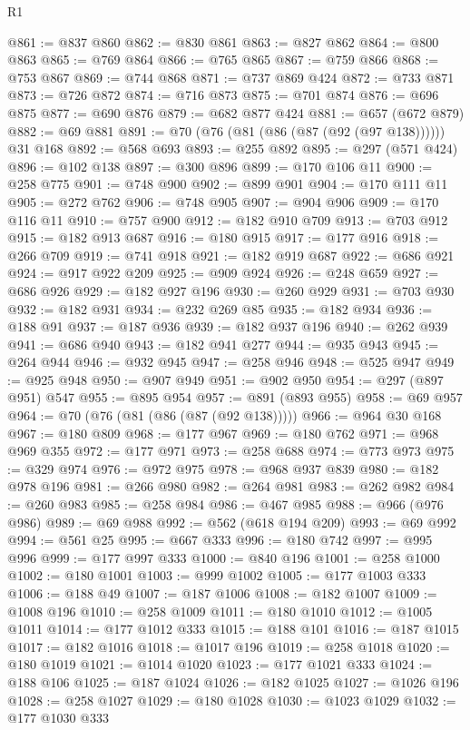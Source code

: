 \begin{lexlean}{R1}
\begin{coremodule}
@861 := @837 @860
@862 := @830 @861
@863 := @827 @862
@864 := @800 @863
@865 := @769 @864
@866 := @765 @865
@867 := @759 @866
@868 := @753 @867
@869 := @744 @868
@871 := @737 @869 @424
@872 := @733 @871
@873 := @726 @872
@874 := @716 @873
@875 := @701 @874
@876 := @696 @875
@877 := @690 @876
@879 := @682 @877 @424
@881 := @657 (@672 @879)
@882 := @69 @881
@891 := @70 (@76 (@81 (@86 (@87 (@92 (@97 @138)))))) @31 @168
@892 := @568 @693
@893 := @255 @892
@895 := @297 (@571 @424)
@896 := @102 @138
@897 := @300 @896
@899 := @170 @106 @11
@900 := @258 @775
@901 := @748 @900
@902 := @899 @901
@904 := @170 @111 @11
@905 := @272 @762
@906 := @748 @905
@907 := @904 @906
@909 := @170 @116 @11
@910 := @757 @900
@912 := @182 @910 @709
@913 := @703 @912
@915 := @182 @913 @687
@916 := @180 @915
@917 := @177 @916
@918 := @266 @709
@919 := @741 @918
@921 := @182 @919 @687
@922 := @686 @921
@924 := @917 @922 @209
@925 := @909 @924
@926 := @248 @659
@927 := @686 @926
@929 := @182 @927 @196
@930 := @260 @929
@931 := @703 @930
@932 := @182 @931
@934 := @232 @269 @85
@935 := @182 @934
@936 := @188 @91
@937 := @187 @936
@939 := @182 @937 @196
@940 := @262 @939
@941 := @686 @940
@943 := @182 @941 @277
@944 := @935 @943
@945 := @264 @944
@946 := @932 @945
@947 := @258 @946
@948 := @525 @947
@949 := @925 @948
@950 := @907 @949
@951 := @902 @950
@954 := @297 (@897 @951) @547
@955 := @895 @954
@957 := @891 (@893 @955)
@958 := @69 @957
@964 := @70 (@76 (@81 (@86 (@87 (@92 @138)))))
@966 := @964 @30 @168
@967 := @180 @809
@968 := @177 @967
@969 := @180 @762
@971 := @968 @969 @355
@972 := @177 @971
@973 := @258 @688
@974 := @773 @973
@975 := @329 @974
@976 := @972 @975
@978 := @968 @937 @839
@980 := @182 @978 @196
@981 := @266 @980
@982 := @264 @981
@983 := @262 @982
@984 := @260 @983
@985 := @258 @984
@986 := @467 @985
@988 := @966 (@976 @986)
@989 := @69 @988
@992 := @562 (@618 @194 @209)
@993 := @69 @992
@994 := @561 @25
@995 := @667 @333
@996 := @180 @742
@997 := @995 @996
@999 := @177 @997 @333
@1000 := @840 @196
@1001 := @258 @1000
@1002 := @180 @1001
@1003 := @999 @1002
@1005 := @177 @1003 @333
@1006 := @188 @49
@1007 := @187 @1006
@1008 := @182 @1007
@1009 := @1008 @196
@1010 := @258 @1009
@1011 := @180 @1010
@1012 := @1005 @1011
@1014 := @177 @1012 @333
@1015 := @188 @101
@1016 := @187 @1015
@1017 := @182 @1016
@1018 := @1017 @196
@1019 := @258 @1018
@1020 := @180 @1019
@1021 := @1014 @1020
@1023 := @177 @1021 @333
@1024 := @188 @106
@1025 := @187 @1024
@1026 := @182 @1025
@1027 := @1026 @196
@1028 := @258 @1027
@1029 := @180 @1028
@1030 := @1023 @1029
@1032 := @177 @1030 @333

\end{coremodule}
\end{lexlean}
